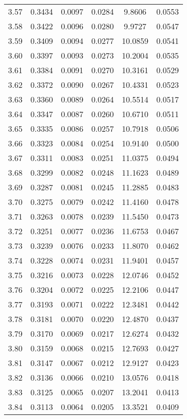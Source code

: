 \documentclass{article}
\begin{document}
\begin{longtable}{cccccc}
3.57 & 0.3434 & 0.0097 & 0.0284 & 9.8606 & 0.0553 \\
3.58 & 0.3422 & 0.0096 & 0.0280 & 9.9727 & 0.0547 \\
3.59 & 0.3409 & 0.0094 & 0.0277 & 10.0859 & 0.0541 \\
3.60 & 0.3397 & 0.0093 & 0.0273 & 10.2004 & 0.0535 \\
3.61 & 0.3384 & 0.0091 & 0.0270 & 10.3161 & 0.0529 \\
3.62 & 0.3372 & 0.0090 & 0.0267 & 10.4331 & 0.0523 \\
3.63 & 0.3360 & 0.0089 & 0.0264 & 10.5514 & 0.0517 \\
3.64 & 0.3347 & 0.0087 & 0.0260 & 10.6710 & 0.0511 \\
3.65 & 0.3335 & 0.0086 & 0.0257 & 10.7918 & 0.0506 \\
3.66 & 0.3323 & 0.0084 & 0.0254 & 10.9140 & 0.0500 \\
3.67 & 0.3311 & 0.0083 & 0.0251 & 11.0375 & 0.0494 \\
3.68 & 0.3299 & 0.0082 & 0.0248 & 11.1623 & 0.0489 \\
3.69 & 0.3287 & 0.0081 & 0.0245 & 11.2885 & 0.0483 \\
3.70 & 0.3275 & 0.0079 & 0.0242 & 11.4160 & 0.0478 \\
3.71 & 0.3263 & 0.0078 & 0.0239 & 11.5450 & 0.0473 \\
3.72 & 0.3251 & 0.0077 & 0.0236 & 11.6753 & 0.0467 \\
3.73 & 0.3239 & 0.0076 & 0.0233 & 11.8070 & 0.0462 \\
3.74 & 0.3228 & 0.0074 & 0.0231 & 11.9401 & 0.0457 \\
3.75 & 0.3216 & 0.0073 & 0.0228 & 12.0746 & 0.0452 \\
3.76 & 0.3204 & 0.0072 & 0.0225 & 12.2106 & 0.0447 \\
3.77 & 0.3193 & 0.0071 & 0.0222 & 12.3481 & 0.0442 \\
3.78 & 0.3181 & 0.0070 & 0.0220 & 12.4870 & 0.0437 \\
3.79 & 0.3170 & 0.0069 & 0.0217 & 12.6274 & 0.0432 \\
3.80 & 0.3159 & 0.0068 & 0.0215 & 12.7693 & 0.0427 \\
3.81 & 0.3147 & 0.0067 & 0.0212 & 12.9127 & 0.0423 \\
3.82 & 0.3136 & 0.0066 & 0.0210 & 13.0576 & 0.0418 \\
3.83 & 0.3125 & 0.0065 & 0.0207 & 13.2041 & 0.0413 \\
3.84 & 0.3113 & 0.0064 & 0.0205 & 13.3521 & 0.0409 \\

\end{longtable}
\end{document}
